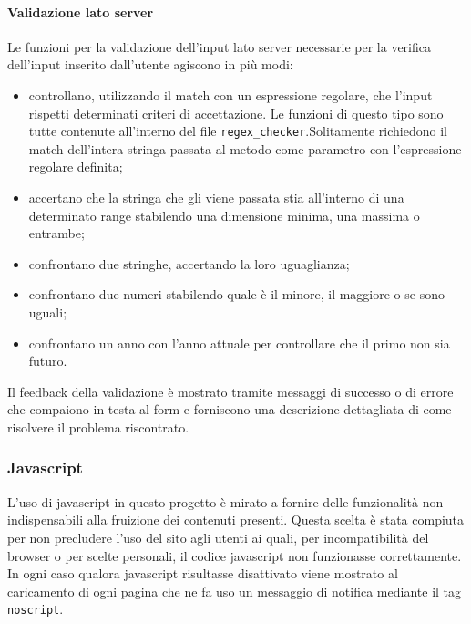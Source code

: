 \documentclass[12pt,a4paper,headings=optiontohead]{article}
\begin{document}
	\paragraph{Validazione lato server}
	Le funzioni per la validazione dell'input lato server necessarie per la verifica dell'input inserito dall'utente agiscono in più modi:
	\begin{itemize}
		\item controllano, utilizzando il match con un espressione regolare, che l'input rispetti determinati criteri di accettazione. Le funzioni di questo tipo sono tutte contenute all'interno del file \texttt{regex\_checker}.Solitamente richiedono il match dell'intera stringa passata al metodo come parametro con l'espressione regolare definita;
		\item accertano che la stringa che gli viene passata stia all'interno di una determinato range stabilendo una dimensione minima, una massima o entrambe;
		\item confrontano due stringhe, accertando la loro uguaglianza;
		\item confrontano due numeri stabilendo quale è il minore, il maggiore o se sono uguali;
		\item confrontano un anno con l'anno attuale per controllare che il primo non sia futuro.
	\end{itemize}
	Il feedback della validazione è mostrato tramite messaggi di successo o di errore che compaiono in testa al form e forniscono una descrizione dettagliata di come risolvere il problema riscontrato.
	
	
	\subsubsection{Javascript}
	L'uso di javascript in questo progetto è mirato a fornire delle funzionalità non indispensabili alla fruizione dei contenuti presenti. Questa scelta è stata compiuta per non precludere l'uso del sito agli utenti ai quali, per incompatibilità del browser o per scelte personali, il codice javascript non funzionasse correttamente. In ogni caso qualora javascript risultasse disattivato viene mostrato al caricamento di ogni pagina che ne fa uso un messaggio di notifica mediante il tag \texttt{noscript}. 
\end{document}
